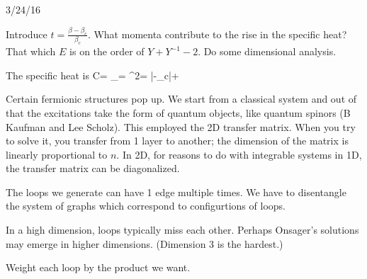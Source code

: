 
{\color{blue}3/24/16}

Introduce $t=\frac{\beta-\beta_c}{\beta_c}$. 
What momenta contribute to the rise in the specific heat? That which $E$ is on the order of $Y+Y^{-1}-2$. Do some dimensional analysis. 

The specific heat is 
\be
C= \left{}\right\rangle_\beta = \beta^2\Psi = \cdots \ln|\beta-\beta_c|+\cdots 
\ee

Certain fermionic structures pop up. We start from a classical system and out of that the excitations take the form of quantum objects, like quantum spinors (B Kaufman and Lee Scholz). This employed the 2D transfer matrix. When you try to solve it, you transfer from 1 layer to another; the dimension of the matrix is linearly proportional to $n$. In 2D, for reasons to do with integrable systems in 1D, the transfer matrix can be diagonalized. 


The loops we generate can have 1 edge multiple times. We have to disentangle the system of graphs which correspond to configurtions of loops. 

In a high dimension, loops typically miss each other. Perhaps Onsager's solutions may emerge in higher dimensions. (Dimension 3 is the hardest.)

Weight each loop by the product we want. 



